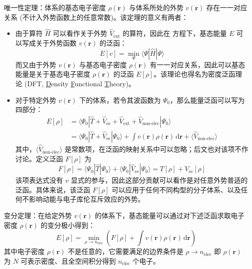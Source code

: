 \textsf{唯一性定理}：体系的基态电子密度 $\rho(\bm{r})$ 与体系所处的外势 $v(\bm{r})$ 存在一一对应关系 (不计入外势函数上的任意常数)。该定理的意义有两者：
\begin{itemize}[nosep]
  \item 由于算符 $\hat H$ 可以看作关于外势 $\hat V_\mathrm{ext}$ 的算符，因此在 \Schrodinger 方程下，基态能量 $E$ 可以写成关于外势函数 $v(\bm{r})$ 的泛函：
  \begin{equation}
    \label{eq.true-system-variation}
    E[v] = \min_\Psi \langle \Psi | \hat H | \Psi \rangle
  \end{equation}
  而又由于外势 $v(\bm{r})$ 与基态电子密度 $\rho(\bm{r})$ 有一一对应关系，因此可以基态能量是关于基态电子密度 $\rho(\bm{r})$ 的泛函 $E[\rho]$。该理论也得名为密度泛函理论 (DFT, \underline{D}ensity \underline{F}unctional \underline{T}heory)。
  
  \item 对于特定外势 $v(\bm{r})$ 下的体系，若令其波函数为 $\Psi_0$，那么能量泛函可以写为四部分：
  \begin{align*}
    E[\rho] &= \langle \Psi_0 | \hat T + \hat V_\mathrm{ee} + \hat V_\mathrm{ext} + \hat V_\text{non-elec} | \Psi_0 \rangle \\
    &= \langle \Psi_0 | \hat T + \hat V_\mathrm{ee} | \Psi_0 \rangle + \int v (\bm{r}) \rho (\bm{r}) \, \mathrm{d} \bm{r} + \langle \hat V_\text{non-elec} \rangle
  \end{align*}
  其中，$\langle \hat V_\text{non-elec} \rangle$ 是常数项，在泛函的映射关系中可以忽略；后文也对该项不作讨论。定义泛函 $F[\rho]$ 为
  \begin{equation}
    \label{eq.f-functional-interacting-system}
    F[\rho] = \langle \Psi_0 | \hat T | \Psi_0 \rangle + \langle \Psi_0 | \hat V_\mathrm{ee} | \Psi_0 \rangle = T[\rho] + V_\mathrm{ee}[\rho]
  \end{equation}
  该项表达式没有 $v$ 显式的参与，因此这部分贡献可以看作是对任意外势普适的泛函。具体来说，该泛函 $F[\rho]$ 可以应用于任何不同构型的分子体系、以及任何不影响动能与电子库伦互斥效应的外势。
\end{itemize}

\textsf{变分定理}：在给定外势 $v(\bm{r})$ 的体系下，基态能量可以通过对下述泛函求取电子密度 $\rho(\bm{r})$ 的变分极小得到：
\begin{equation}
  E[\rho] = \min_{\rho \rightarrow n_\mathrm{elec}} \left( F[\rho] + \int v (\bm{r}) \rho (\bm{r}) \, \mathrm{d} \bm{r} \right)
\end{equation}
其中电子密度 $\rho(\bm{r})$ 不是任意的，它需要满足的边界条件是 $\rho \rightarrow n_\mathrm{elec}$ 即 $\rho(\bm{r})$ 为 $N$ 可表示密度、且全空间积分得到 $n_\mathrm{elec}$ 个电子。

